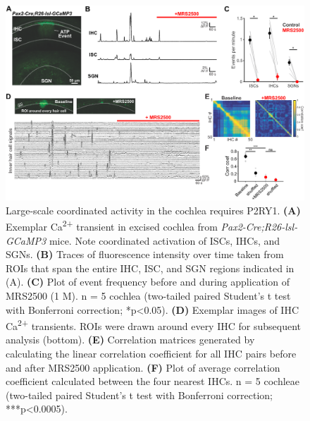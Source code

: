 \documentclass[9pt,lineno]{elife}
\begin{document}
\begin{figure}
\begin{fullwidth}
\includegraphics[width=.95\linewidth]{figures/Fig5.pdf}
\caption{Large-scale coordinated activity in the cochlea requires P2RY1.
\textbf{(A)} Exemplar Ca\textsuperscript{2+} transient in excised cochlea from \textit{Pax2-Cre;R26-lsl-GCaMP3} mice. Note coordinated activation of ISCs, IHCs, and SGNs. 
\textbf{(B)} Traces of fluorescence intensity over time taken from ROIs that span the entire IHC, ISC, and SGN regions indicated in (A).
\textbf{(C)} Plot of event frequency before and during application of MRS2500 (1 \textmu M). n = 5 cochlea (two-tailed paired Student's t test with Bonferroni correction; *p<0.05).
\textbf{(D)} Exemplar images of IHC Ca\textsuperscript{2+} transients. ROIs were drawn around every IHC for subsequent analysis (bottom). 
\textbf{(E)} Correlation matrices generated by calculating the linear correlation coefficient for all IHC pairs before and after MRS2500 application.
\textbf{(F)} Plot of average correlation coefficient calculated between the four nearest IHCs. n = 5 cochleae (two-tailed paired Student's t test with Bonferroni correction; ***p<0.0005).
}
\label{fig:f5}
\end{fullwidth}
\end{figure}
\end{document}
